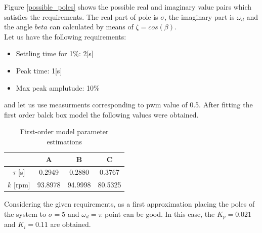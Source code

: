\documentclass[12pt,english,twoside]{article}
\begin{document}
Figure \ref{possible_poles} shows the possible real and imaginary value pairs which satisfies the requirements. The real part of pole is $\sigma$, the imaginary part is $\omega_d$ and the angle $beta$ can calculated by means of $\zeta = cos(\beta)$. \\[2mm]
\noindent Let us have the following requirements:
\begin{itemize}
	\item Settling time for 1$\%$: 2[s]
	\item Peak time: 1[s]
	\item Max peak amplutude: 10\%
\end{itemize}
\noindent and let us use measurments corresponding to pwm value of 0.5. After fitting the first order balck box model the following values were obtained.
\begin{table}[h]
	\centering
	\label{first_order_model_table_50}
	\begin{tabular}{cccc}
		\hline
		& A  		& B  		& C   		\\ \hline
		$\tau$ {[}s{]} 		& 0.2949 	& 0.2880 	& 0.3767 	 \\
		$k$ {[}rpm{]}       & 93.8978 	& 94.9998 	& 80.5325   	\\ \hline
	\end{tabular}
	\caption{First-order model parameter estimations}
\end{table}
Considering the given requirements, as a first approximation placing the poles of the system to $\sigma = 5$ and $\omega_d = \pi$ point can be good.
In this case, the $K_p = 0.021$ and $K_i = 0.11$ are obtained.
\end{document}
